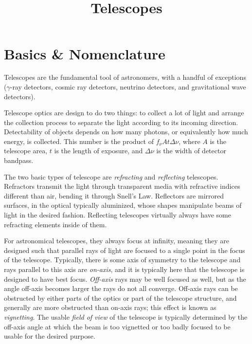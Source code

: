 \title{\bf Telescopes}

\section{Basics \& Nomenclature}

Telescopes are the fundamental tool of astronomers, with a handful of
exceptions ($\gamma$-ray detectors, cosmic ray detectors, neutrino
detectors, and gravitational wave detectors). 

Telescope optics are design to do two things: to collect a lot of
light and arrange the collection process to separate the light
according to its incoming direction. Detectability of objects depends
on how many photons, or equivalently how much energy, is
collected. This number is the product of $f_\nu A t \Delta\nu$, where
$A$ is the telescope area, $t$ is the length of exposure, and
$\Delta\nu$ is the width of detector bandpass.

The two basic types of telescope are {\it refracting} and {\it
reflecting} telescopes. Refractors transmit the light through
transparent media with refractive indices different than air, bending
it through Snell's Law. Reflectors are mirrored surfaces, in the
optical typically aluminized, whose shapes manipulate beams of light
in the desired fashion. Reflecting telescopes virtually always have
some refracting elements inside of them.

For astronomical telescopes, they always focus at infinity, meaning
they are designed such that parallel rays of light are focused to a
single point in the focus of the telescope.  Typically, there is some
axis of symmetry to the telescope and rays parallel to this axis are
{\it on-axis}, and it is typically here that the telescope is designed
to have best focus. {\it Off-axis} rays may be well focused as well,
but as the angle off-axis becomes larger the rays do not all
converge. Off-axis rays can be obstructed by either parts of the
optics or part of the telescope structure, and generally are more
obstructed than on-axis rays; this effect is known as {\it
vignetting}.  The usable {\it field of view} of the telescope is
typically determined by the off-axis angle at which the beam is too
vignetted or too badly focused to be usable for the desired purpose.


